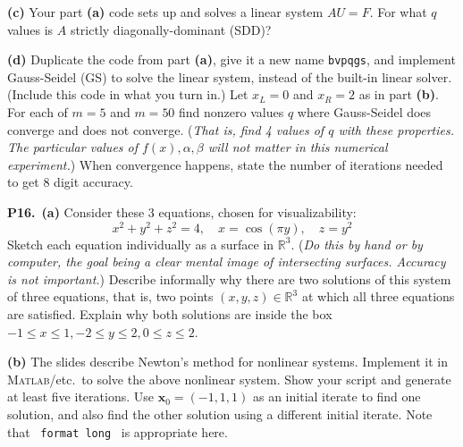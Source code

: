 \documentclass[12pt]{amsart}
\newcommand{\bx}{\mathbf{x}}
\newcommand{\RR}{\mathbb{R}}
\newcommand{\prob}[1]{\bigskip\noindent\textbf{#1.}\quad }
\newcommand{\epart}[1]{\medskip\noindent\textbf{(#1)}\quad }
\newcommand{\ppart}[1]{\,\textbf{(#1)}\quad }
\newcommand{\Matlab}{\textsc{Matlab}\xspace}
\begin{document}
\epart{c}  Your part \textbf{(a)} code sets up and solves a linear system $AU=F$.  For what $q$ values is $A$ strictly diagonally-dominant (SDD)?

\epart{d}  Duplicate the code from part \textbf{(a)}, give it a new name \texttt{bvpqgs}, and implement Gauss-Seidel (GS) to solve the linear system, instead of the built-in linear solver.  (Include this code in what you turn in.)  Let $x_L=0$ and $x_R=2$ as in part \textbf{(b)}.  For each of $m=5$ and $m=50$ find nonzero values $q$ where Gauss-Seidel does converge and does not converge.  (\emph{That is, find 4 values of $q$ with these properties.  The particular values of $f(x),\alpha,\beta$ will not matter in this numerical experiment.})  When convergence happens, state the number of iterations needed to get 8 digit accuracy.


\prob{P16}  \ppart{a}  Consider these 3 equations, chosen for visualizability:
  $$x^2+y^2+z^2 = 4, \quad x = \cos(\pi y), \quad z = y^2$$
Sketch each equation individually as a surface in $\RR^3$.  (\emph{Do this by hand or by computer, the goal being a clear mental image of intersecting surfaces.  Accuracy is not important.})  Describe informally why there are two solutions of this system of three equations, that is, two points $(x,y,z)\in\RR^3$ at which all three equations are satisfied.  Explain why both solutions are inside the box $-1\le x \le 1, -2\le y \le 2, 0\le z \le 2$.

\epart{b}  The slides describe Newton's method for nonlinear systems.  Implement it in \Matlab/etc.~to solve the above nonlinear system.  Show your script and generate at least five iterations.  Use $\bx_0=(-1,1,1)$ as an initial iterate to find one solution, and also find the other solution using a different initial iterate.  Note that \, \texttt{format long} \, is appropriate here.
\end{document}
